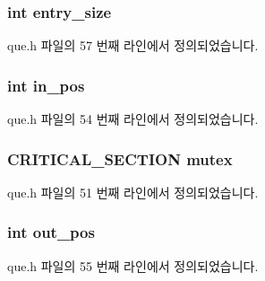 \subsubsection[{\texorpdfstring{entry\+\_\+size}{entry_size}}]{\setlength{\rightskip}{0pt plus 5cm}int entry\+\_\+size}\hypertarget{structque__def_a85b70ab9a21d34366075fd47dc59f555}{}\label{structque__def_a85b70ab9a21d34366075fd47dc59f555}


que.\+h 파일의 57 번째 라인에서 정의되었습니다.

\subsubsection[{\texorpdfstring{in\+\_\+pos}{in_pos}}]{\setlength{\rightskip}{0pt plus 5cm}int in\+\_\+pos}\hypertarget{structque__def_a8a3e7803079f633c16e621bbdbbbdaf5}{}\label{structque__def_a8a3e7803079f633c16e621bbdbbbdaf5}


que.\+h 파일의 54 번째 라인에서 정의되었습니다.

\subsubsection[{\texorpdfstring{mutex}{mutex}}]{\setlength{\rightskip}{0pt plus 5cm}C\+R\+I\+T\+I\+C\+A\+L\+\_\+\+S\+E\+C\+T\+I\+ON mutex}\hypertarget{structque__def_ab06c895e3ddb3591c4f22c366466d4ca}{}\label{structque__def_ab06c895e3ddb3591c4f22c366466d4ca}


que.\+h 파일의 51 번째 라인에서 정의되었습니다.

\subsubsection[{\texorpdfstring{out\+\_\+pos}{out_pos}}]{\setlength{\rightskip}{0pt plus 5cm}int out\+\_\+pos}\hypertarget{structque__def_aa2298e702cfd12ae1cbebcb523196e7c}{}\label{structque__def_aa2298e702cfd12ae1cbebcb523196e7c}


que.\+h 파일의 55 번째 라인에서 정의되었습니다.

